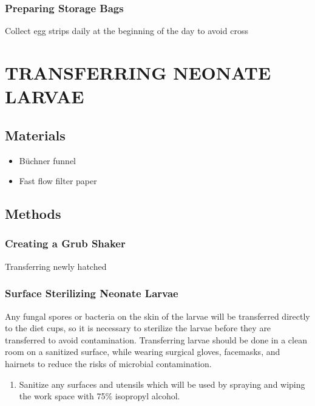 \documentclass{sop_class}[overrideChapters] %
\providecommand{\tightlist}{%
  \setlength{\itemsep}{0pt}\setlength{\parskip}{0pt}}
\begin{document}
{\hypertarget{baggie-prep}{%
\subsection{Preparing Storage Bags}\label{baggie-prep}}

Collect egg strips daily at the beginning of the day to avoid cross

\hypertarget{neonate-transfer}{%
\chapter{TRANSFERRING NEONATE LARVAE}\label{neonate-transfer}}

\hypertarget{materials-3}{%
\section{Materials}\label{materials-3}}
\begin{itemize}
\tightlist
\item
  Büchner funnel
\item
  Fast flow filter paper
\end{itemize}
\hypertarget{methods-3}{%
\section{Methods}\label{methods-3}}

\hypertarget{make-grub-shake}{%
\subsection{Creating a Grub Shaker}\label{make-grub-shake}}

Transferring newly hatched

\hypertarget{sterilizing-neonates}{%
\subsection{Surface Sterilizing Neonate Larvae}\label{sterilizing-neonates}}

Any fungal spores or bacteria on the skin of the larvae will be
transferred directly to the diet cups, so it is necessary to sterilize
the larvae before they are transferred to avoid contamination.
Transferring larvae should be done in a clean room on a sanitized
surface, while wearing surgical gloves, facemasks, and hairnets to
reduce the risks of microbial contamination.
\begin{enumerate}
\def\labelenumi{\arabic{enumi}.}
\tightlist
\item
  Sanitize any surfaces and utensils which will be used by spraying
  and wiping the work space with 75\% isopropyl alcohol.
\end{enumerate}
\hypertarget{moth-transfers}{%
}}
\end{document}
